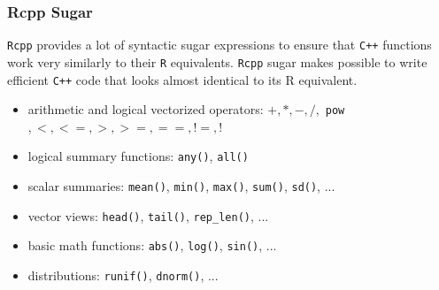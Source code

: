 \documentclass{beamer}
\def\code#1{\texttt{#1}} %
\begin{document}
\begin{frame}
\frametitle{Rcpp Sugar}
\code{Rcpp} provides a lot of syntactic sugar expressions to ensure that \code{C++} functions work very similarly to their \code{R} equivalents.
\code{Rcpp} sugar makes possible to write efficient \code{C++} code that looks almost identical to its R equivalent.

\begin{itemize}
    \item<1-> arithmetic and logical vectorized operators: $+, *, -, /,$ \code{pow}$, <, <=, >, >=, ==, !=, !$
    \item<2-> logical summary functions: \code{any()}, \code{all()}
    \item<3-> scalar summaries: \code{mean()}, \code{min()}, \code{max()}, \code{sum()}, \code{sd()}, ...
    \item<4-> vector views: \code{head()}, \code{tail()}, \code{rep\_len()}, ...
    \item<5-> basic math functions: \code{abs()}, \code{log()}, \code{sin()}, ... 
    \item<6-> distributions: \code{runif()}, \code{dnorm()}, ...
\end{itemize}
\end{frame}
\end{document}

